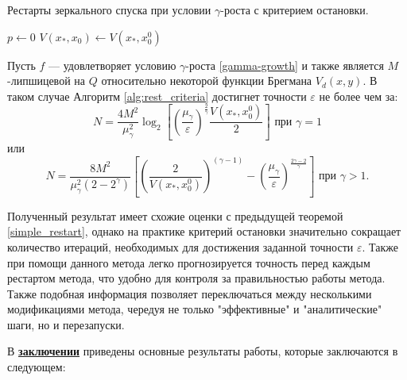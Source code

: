  \begin{algorithm}[htp]
     \caption{Рестарты зеркального спуска при условии $\gamma$-роста с критерием остановки.}
     \label{alg:rest_criteria}
     $p \gets 0$\;
     $V(x_*, x_0) \gets V(x_*,x_0^0)$\;
 \end{algorithm}
 \begin{theorem}
     Пусть $f$ --- удовлетворяет условию $\gamma$-роста \eqref{gamma-growth} и также является $M$-липшицевой на $Q$ относительно некоторой функции Брегмана $V_d(x, y)$. В таком случае Алгоритм \ref{alg:rest_criteria} достигнет точности $\varepsilon$ не более чем за:
     \begin{equation}
        N =  \frac{4 M^2}{\mu_{\gamma}^2} \log_2{\left[\left(\frac{\mu_{\gamma}}{\varepsilon}\right)^{\frac{2}{\gamma}} \frac{V(x_*, x_0^0)}{2}\right]} \text{ при } \gamma = 1
    \end{equation}
    или
    \begin{equation}
        N = \frac{8  M^2}{\mu_{\gamma}^2 (2 - 2^{\gamma})} \left[ \left(\frac{2}{V(x_*, x_0^0)}\right)^{(\gamma - 1)}  - \left(\frac{\mu_{\gamma}}{\varepsilon}\right)^{\frac{2\gamma - 2}{\gamma}} \right] \text{ при } \gamma > 1.
    \end{equation}
 \end{theorem}

 Полученный результат имеет схожие оценки с предыдущей теоремой \ref{simple_restart}, однако на практике критерий остановки значительно сокращает количество итераций, необходимых для достижения заданной точности $\varepsilon$. Также при помощи данного метода легко прогнозируется точность перед каждым рестартом метода, что удобно для контроля за правильностью работы метода. Также подобная информация позволяет переключаться между несколькими модификациями метода, чередуя не только "эффективные" и "аналитические" шаги, но и перезапуски.  

\FloatBarrier
{}                                  %
В \underline{\textbf{заключении}} приведены основные результаты работы, которые заключаются в следующем:


